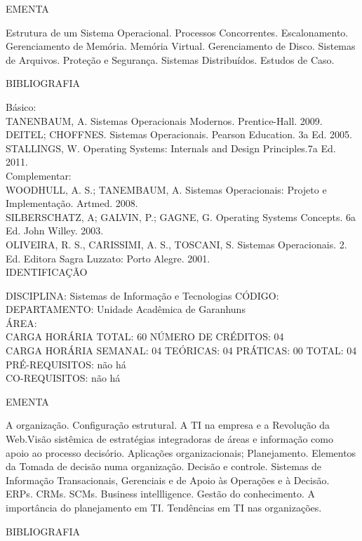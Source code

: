 \documentclass[
	12pt,				%
	openright,			%
  oneside,     %
	a4paper,			%
	chapter=TITLE,		%
	english,			%
	french,				%
	spanish,			%
	brazil				%
	]{abntex2}
\begin{document}
\begin{apendicesenv}
EMENTA 

Estrutura de um Sistema Operacional. Processos Concorrentes.
Escalonamento. Gerenciamento de Memória. Memória Virtual. Gerenciamento
de Disco. Sistemas de Arquivos. Proteção e Segurança. Sistemas
Distribuídos. Estudos de Caso.

BIBLIOGRAFIA 

Básico:\\
TANENBAUM, A. Sistemas Operacionais Modernos. Prentice-Hall. 2009.\\
DEITEL; CHOFFNES. Sistemas Operacionais. Pearson Education. 3a Ed.
2005.\\
STALLINGS, W. Operating Systems: Internals and Design Principles.7a Ed.
2011.\\
Complementar:\\
WOODHULL, A. S.; TANEMBAUM, A. Sistemas Operacionais: Projeto e
Implementação. Artmed. 2008.\\
SILBERSCHATZ, A; GALVIN, P.; GAGNE, G. Operating Systems Concepts. 6a
Ed. John Willey. 2003.\\
OLIVEIRA, R. S., CARISSIMI, A. S., TOSCANI, S. Sistemas Operacionais. 2.
Ed. Editora Sagra Luzzato: Porto Alegre. 2001.\\


\newpage IDENTIFICAÇÃO

DISCIPLINA: Sistemas de Informação e Tecnologias CÓDIGO:\\ 
DEPARTAMENTO: Unidade Acadêmica de Garanhuns\\
ÁREA:\\
CARGA HORÁRIA TOTAL: 60 NÚMERO DE CRÉDITOS: 04\\
CARGA HORÁRIA SEMANAL: 04 TEÓRICAS: 04 PRÁTICAS: 00 TOTAL: 04\\
PRÉ-REQUISITOS: não há\\
CO-REQUISITOS: não há

EMENTA 

A organização. Configuração estrutural. A TI na empresa e a Revolução da
Web.Visão sistêmica de estratégias integradoras de áreas e informação
como apoio ao processo decisório. Aplicações organizacionais;
Planejamento. Elementos da Tomada de decisão numa organização. Decisão
e controle. Sistemas de Informação Transacionais, Gerenciais e de Apoio
às Operações e à Decisão. ERPs. CRMs. SCMs. Business intellligence.
Gestão do conhecimento. A importância do planejamento em TI. Tendências
em TI nas organizações.

BIBLIOGRAFIA 


\end{apendicesenv}
\end{document}
